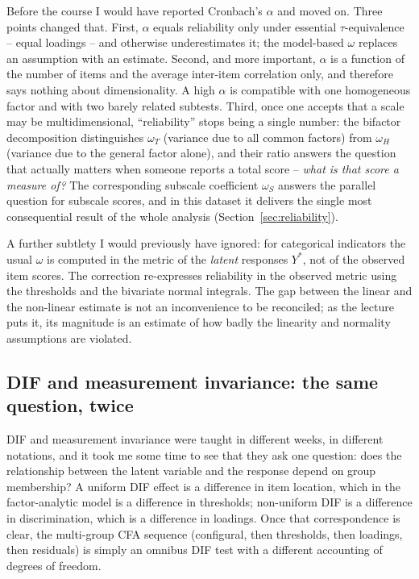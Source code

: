 \documentclass[11pt,a4paper]{article}
\begin{document}
Before the course I would have reported Cronbach's $\alpha$ and moved on. Three
points changed that. First, $\alpha$ equals reliability only under essential
$\tau$-equivalence -- equal loadings -- and otherwise underestimates it; the
model-based $\omega$ replaces an assumption with an estimate. Second, and more
important, $\alpha$ is a function of the number of items and the average
inter-item correlation only, and therefore says nothing about dimensionality. A
high $\alpha$ is compatible with one homogeneous factor and with two barely
related subtests. Third, once one accepts that a scale may be multidimensional,
``reliability'' stops being a single number: the bifactor decomposition
distinguishes $\omega_T$ (variance due to all common factors) from $\omega_H$
(variance due to the general factor alone), and their ratio answers the question
that actually matters when someone reports a total score -- \emph{what is that
score a measure of?} The corresponding subscale coefficient $\omega_S$ answers the
parallel question for subscale scores, and in this dataset it delivers the single
most consequential result of the whole analysis (Section~\ref{sec:reliability}).

A further subtlety I would previously have ignored: for categorical indicators the
usual $\omega$ is computed in the metric of the \emph{latent} responses $Y^{*}$,
not of the observed item scores. The \citet{green2009reliability} correction
re-expresses reliability in the observed metric using the thresholds and the
bivariate normal integrals. The gap between the linear and the non-linear estimate
is not an inconvenience to be reconciled; as the lecture puts it, its magnitude is
an estimate of how badly the linearity and normality assumptions are violated.

\subsection{DIF and measurement invariance: the same question, twice}

DIF and measurement invariance were taught in different weeks, in different
notations, and it took me some time to see that they ask one question: does the
relationship between the latent variable and the response depend on group
membership? A uniform DIF effect is a difference in item location, which in the
factor-analytic model is a difference in thresholds; non-uniform DIF is a
difference in discrimination, which is a difference in loadings. Once that
correspondence is clear, the multi-group CFA sequence (configural, then
thresholds, then loadings, then residuals) is simply an omnibus DIF test with a
different accounting of degrees of freedom.
\end{document}
